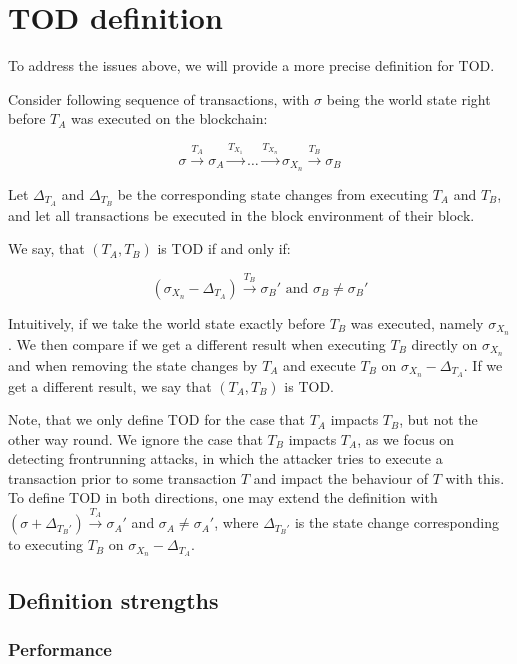 \documentclass[draft,final]{vutinfth} %
\begin{document}
\section{TOD definition}

To address the issues above, we will provide a more precise definition for TOD.

Consider following sequence of transactions, with $\sigma$ being the world state right before $T_A$ was executed on the blockchain:

$$\sigma \xrightarrow{T_A} \sigma_A \xrightarrow{T_{X_1}} \dots \xrightarrow{T_{X_n}} \sigma_{X_n} \xrightarrow{T_B} \sigma_B$$

Let $\Delta_{T_A}$ and $\Delta_{T_B}$ be the corresponding state changes from executing $T_A$ and $T_B$, and let all transactions be executed in the block environment of their block.

We say, that $(T_A, T_B)$ is TOD if and only if:

$$(\sigma_{X_n} - \Delta_{T_A}) \xrightarrow{T_B} \sigma_B\prime\text{ and }\sigma_B \neq \sigma_B\prime$$

Intuitively, if we take the world state exactly before $T_B$ was executed, namely $\sigma_{X_n}$. We then compare if we get a different result when executing $T_B$ directly on $\sigma_{X_n}$ and when removing the state changes by $T_A$ and execute $T_B$ on $\sigma_{X_n} - \Delta_{T_A}$. If we get a different result, we say that $(T_A, T_B)$ is TOD.

Note, that we only define TOD for the case that $T_A$ impacts $T_B$, but not the other way round. We ignore the case that $T_B$ impacts $T_A$, as we focus on detecting frontrunning attacks, in which the attacker tries to execute a transaction prior to some transaction $T$ and impact the behaviour of $T$ with this. To define TOD in both directions, one may extend the definition with $(\sigma + \Delta_{T_B\prime}) \xrightarrow{T_A} \sigma_A\prime$ and $\sigma_A \neq \sigma_A\prime$, where $\Delta_{T_B\prime}$ is the state change corresponding to executing $T_B$ on $\sigma_{X_n} - \Delta_{T_A}$.

\subsection{Definition strengths}

\subsubsection{Performance}
\end{document}
